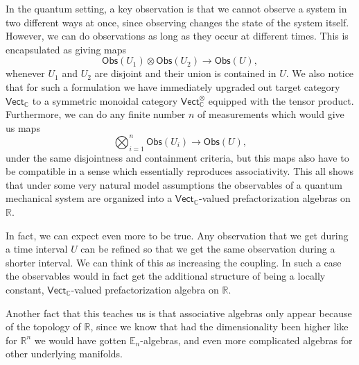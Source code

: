 \documentclass[../text]{subfiles}
\begin{document}
\begin{example}
    In the quantum setting, a key observation is that we cannot observe a system in two different ways at once, since observing changes the state of the system itself. However, we can do observations as long as they occur at different times. This is encapsulated as giving maps
    \begin{equation}
        \mathsf{Obs} (U_1) \otimes \mathsf{Obs} (U_2) \xrightarrow{\quad} \mathsf{Obs} (U),
    \end{equation}
    whenever $U_1$ and $U_2$ are disjoint and their union is contained in $U$. We also notice that for such a formulation we have immediately upgraded out target category $\mathsf{Vect}_{\mathbb{C}}$ to a symmetric monoidal category $\mathsf{Vect}_{\mathbb{C}}^{\otimes}$ equipped with the tensor product. Furthermore, we can do any finite number $n$ of measurements which would give us maps
    \begin{equation}
        \bigotimes_{i=1}^{n} \mathsf{Obs} (U_i) \xrightarrow{\quad} \mathsf{Obs} (U),
    \end{equation}
    under the same disjointness and containment criteria, but this maps also have to be compatible in a sense which essentially reproduces associativity. This all shows that under some very natural model assumptions the observables of a quantum mechanical system are organized into a $\mathsf{Vect}_{\mathbb{C}}$-valued prefactorization algebras on $\mathbb{R}$.

    In fact, we can expect even more to be true. Any observation that we get during a time interval $U$ can be refined so that we get the same observation during a shorter interval. We can think of this as increasing the coupling. In such a case the observables would in fact get the additional structure of being a locally constant, $\mathsf{Vect}_{\mathbb{C}}$-valued prefactorization algebra on $\mathbb{R}$.

    Another fact that this teaches us is that associative algebras only appear because of the topology of $\mathbb{R}$, since we know that had the dimensionality been higher like for $\mathbb{R}^n$ we would have gotten $\mathbb{E}_n$-algebras, and even more complicated algebras for other underlying manifolds.
\end{example}
\end{document}
